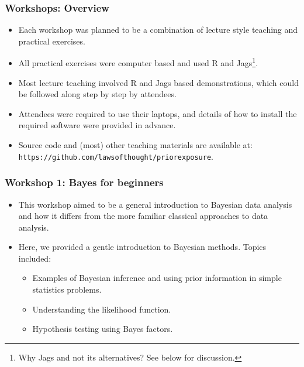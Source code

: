 \begin{frame}
	\frametitle{Workshops: Overview}

	\begin{itemize}
		\item Each workshop was planned to be a combination of lecture style teaching and practical exercises.
		\item All practical exercises were computer based and used R and Jags\footnote{Why Jags and not its alternatives? See below for discussion.}.
		\item Most lecture teaching involved R and Jags based demonstrations, which could be followed along step by step by attendees.
		\item Attendees were required to use their laptops, and details of how to install the required software were provided in advance.
		\item Source code and (most) other teaching materials are available at: \texttt{https://github.com/lawsofthought/priorexposure}.
	\end{itemize}

\end{frame}

\begin{frame}
	\frametitle{Workshop 1: Bayes for beginners}

	\begin{itemize}
		\item This workshop aimed to be a general introduction to Bayesian data analysis and how it differs from the more familiar classical approaches to data analysis.
		\item Here, we provided a gentle introduction to Bayesian methods. Topics included:
			\begin{itemize}
				\item Examples of Bayesian inference and using prior information in simple statistics problems.
				\item Understanding the likelihood function.
				\item Hypothesis testing using Bayes factors.
			\end{itemize}
	\end{itemize}

\end{frame}


